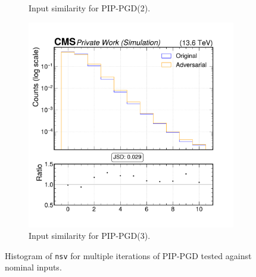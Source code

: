 \begin{figure}[h]
\begin{subfigure}[t]{0.32\textwidth}
    \caption*{Input similarity for PIP-PGD(2).}
  \end{subfigure}\hfill
  \begin{subfigure}[t]{0.32\textwidth}
    \includegraphics[width=\linewidth]{media/output/features/compare/combined_it_3/cmp_global_features_nsv.pdf}
    \caption*{Input similarity for PIP-PGD(3).}
  \end{subfigure}

  \caption*{Histogram of \texttt{nsv} for multiple iterations of PIP-PGD tested against nominal inputs.}
  \label{fig:combined_input_nsv}
\end{figure}

